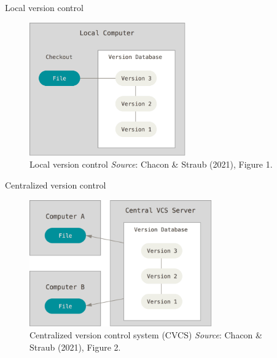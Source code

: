 \documentclass[handout]{beamer}
\begin{document}
\begin{frame}{Local version control}
  \begin{figure}
	  \includegraphics[width=0.6\textwidth]{figures/fig1_local.png}
	  \caption{Local version control \textit{Source}: Chacon \& Straub (2021), Figure 1.}
  \end{figure} 
\end{frame}

\begin{frame}{Centralized version control}
  \begin{figure}
	  \includegraphics[width=0.7\textwidth]{figures/fig2_cvcs.png}
	  \caption{Centralized version control system (CVCS) \textit{Source}: Chacon \& Straub (2021), Figure 2.}
  \end{figure} 
\end{frame}
\end{document}
